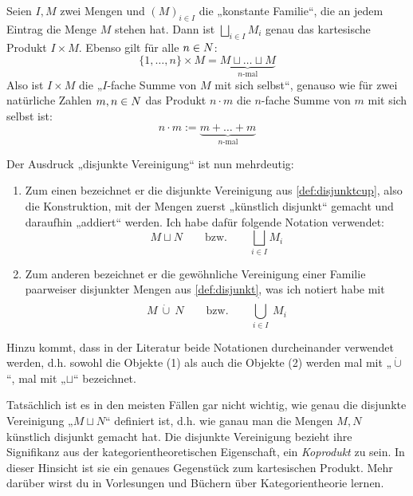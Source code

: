     
\begin{bem}
    Seien $I,M$ zwei Mengen und $(M)_{i\in I}$ die „konstante Familie“, die an jedem Eintrag die Menge $M$ stehen hat. Dann ist $\bigsqcup_{i\in I} M_i$ genau das kartesische Produkt $I\times M$. Ebenso gilt für alle $n\in \relax N$:
        \[ \{1,\dots , n\} \times M = \underbrace{M\sqcup\ldots\sqcup M}_{\text{$n$-mal}} \]
    Also ist $I\times M$ die „$I$-fache Summe von $M$ mit sich selbst“, genauso wie für zwei natürliche Zahlen $m,n\in \relax N$ das Produkt $n\cdot m$ die $n$-fache Summe von $m$ mit sich selbst ist:
        \[ n\cdot m := \underbrace{m +\ldots + m}_{\text{$n$-mal}}\]
\end{bem}


\begin{vorschau}
    Der Ausdruck „disjunkte Vereinigung“ ist nun mehrdeutig:%
    \begin{enumerate}[(1)]
        \item Zum einen bezeichnet er die disjunkte Vereinigung aus \cref{def:disjunktcup}, also die Konstruktion, mit der Mengen zuerst „künstlich disjunkt“ gemacht und daraufhin „addiert“ werden. Ich habe dafür folgende Notation verwendet:
            \[ M\sqcup N \qquad\text{bzw.}\qquad \bigsqcup_{i\in I} M_i \]
        \item Zum anderen bezeichnet er die gewöhnliche Vereinigung einer Familie paarweiser disjunkter Mengen aus \cref{def:disjunkt}, was ich notiert habe mit
            \[ M\ \dot\cup\ N \qquad\text{bzw.}\qquad   \dot{\bigcup_{i\in I}}\ M_i \]
    \end{enumerate}
    Hinzu kommt, dass in der Literatur beide Notationen durcheinander verwendet werden, d.h. sowohl die Objekte (1) als auch die Objekte (2) werden mal mit „$\dot\cup$“, mal mit „$\sqcup$“ bezeichnet.
    
    Tatsächlich ist es in den meisten Fällen gar nicht wichtig, wie genau die disjunkte Vereinigung „$M \sqcup N$“ definiert ist, d.h. wie ganau man die Mengen $M,N$ künstlich disjunkt gemacht hat. Die disjunkte Vereinigung bezieht ihre Signifikanz aus der kategorientheoretischen Eigenschaft, ein \emph{Koprodukt} zu sein. In dieser Hinsicht ist sie ein genaues Gegenstück zum kartesischen Produkt. Mehr darüber wirst du in Vorlesungen und Büchern über Kategorientheorie lernen.
\end{vorschau}





